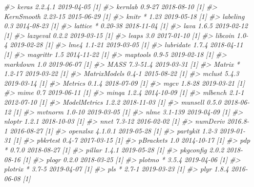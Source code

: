 \documentclass[]{krantz}
\makeatletter
\newenvironment{Shaded}{\begin{snugshade}}{\end{snugshade}}
\newcommand{\CommentTok}[1]{\textcolor[rgb]{0.37,0.37,0.37}{\textit{#1}}}
\newenvironment{kframe}{%
\medskip{}
\setlength{\fboxsep}{.8em}
 \def\at@end@of@kframe{}%
 \ifinner\ifhmode%
  \def\at@end@of@kframe{\end{minipage}}%
  \begin{minipage}{\columnwidth}%
 \fi\fi%
 \def\FrameCommand##1{\hskip\@totalleftmargin \hskip-\fboxsep
 \colorbox{shadecolor}{##1}\hskip-\fboxsep
     \hskip-\linewidth \hskip-\@totalleftmargin \hskip\columnwidth}%
 \MakeFramed {\advance\hsize-\width
   \@totalleftmargin\z@ \linewidth\hsize
   \@setminipage}}%
 {\par\unskip\endMakeFramed%
 \at@end@of@kframe}
\renewenvironment{Shaded}{\begin{kframe}}{\end{kframe}}
\makeatother
\begin{document}
\begin{Shaded}
\begin{Highlighting}[]
\CommentTok{#>    keras           2.2.4.1    2019-04-05 [1]}
\CommentTok{#>    kernlab         0.9-27     2018-08-10 [1]}
\CommentTok{#>    KernSmooth      2.23-15    2015-06-29 [1]}
\CommentTok{#>    knitr         * 1.23       2019-05-18 [1]}
\CommentTok{#>    labeling        0.3        2014-08-23 [1]}
\CommentTok{#>    lattice       * 0.20-38    2018-11-04 [1]}
\CommentTok{#>    lava            1.6.5      2019-02-12 [1]}
\CommentTok{#>    lazyeval        0.2.2      2019-03-15 [1]}
\CommentTok{#>    leaps           3.0        2017-01-10 [1]}
\CommentTok{#>    libcoin         1.0-4      2019-02-28 [1]}
\CommentTok{#>    lme4            1.1-21     2019-03-05 [1]}
\CommentTok{#>    lubridate       1.7.4      2018-04-11 [1]}
\CommentTok{#>    magrittr        1.5        2014-11-22 [1]}
\CommentTok{#>    maptools        0.9-5      2019-02-18 [1]}
\CommentTok{#>    markdown        1.0        2019-06-07 [1]}
\CommentTok{#>    MASS            7.3-51.4   2019-03-31 [1]}
\CommentTok{#>    Matrix        * 1.2-17     2019-03-22 [1]}
\CommentTok{#>    MatrixModels    0.4-1      2015-08-22 [1]}
\CommentTok{#>    mclust          5.4.3      2019-03-14 [1]}
\CommentTok{#>    Metrics         0.1.4      2018-07-09 [1]}
\CommentTok{#>    mgcv            1.8-28     2019-03-21 [1]}
\CommentTok{#>    mime            0.7        2019-06-11 [1]}
\CommentTok{#>    minqa           1.2.4      2014-10-09 [1]}
\CommentTok{#>    mlbench         2.1-1      2012-07-10 [1]}
\CommentTok{#>    ModelMetrics    1.2.2      2018-11-03 [1]}
\CommentTok{#>    munsell         0.5.0      2018-06-12 [1]}
\CommentTok{#>    mvtnorm         1.0-10     2019-03-05 [1]}
\CommentTok{#>    nlme            3.1-139    2019-04-09 [1]}
\CommentTok{#>    nloptr          1.2.1      2018-10-03 [1]}
\CommentTok{#>    nnet            7.3-12     2016-02-02 [1]}
\CommentTok{#>    numDeriv        2016.8-1   2016-08-27 [1]}
\CommentTok{#>    openxlsx        4.1.0.1    2019-05-28 [1]}
\CommentTok{#>    partykit        1.2-3      2019-01-31 [1]}
\CommentTok{#>    pbkrtest        0.4-7      2017-03-15 [1]}
\CommentTok{#>    pBrackets       1.0        2014-10-17 [1]}
\CommentTok{#>    pdp           * 0.7.0      2018-08-27 [1]}
\CommentTok{#>    pillar          1.4.1      2019-05-28 [1]}
\CommentTok{#>    pkgconfig       2.0.2      2018-08-16 [1]}
\CommentTok{#>    plogr           0.2.0      2018-03-25 [1]}
\CommentTok{#>    plotmo        * 3.5.4      2019-04-06 [1]}
\CommentTok{#>    plotrix       * 3.7-5      2019-04-07 [1]}
\CommentTok{#>    pls           * 2.7-1      2019-03-23 [1]}
\CommentTok{#>    plyr            1.8.4      2016-06-08 [1]}

\end{Highlighting}
\end{Shaded}
\end{document}
